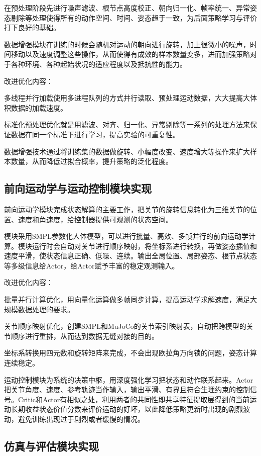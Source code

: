 在预处理阶段先进行噪声滤波、根节点高度校正、朝向归一化、帧率统一、异常姿态剔除等处理使得所有的动作空间、时间、姿态趋于一致，为后面策略学习与评价打下良好的基础。

数据增强模块在训练的时候会随机对运动的朝向进行旋转，加上很微小的噪声，时间移动以及速度调整这些操作，从而使得有成效的样本数量变多，进而加强策略对于各种环境、各种起始状况的适应程度以及抵抗性的能力。

改进优化内容：

多线程并行加载使用多进程队列的方式并行读取、预处理运动数据，大大提高大体积数据的加载速度。

标准化预处理优化就是用滤波、对齐、归一化、异常剔除等一系列的处理方法来保证数据在同一个标准下进行学习，提高实验的可重复性。

数据增强技术通过将训练集的数据做旋转、小幅度改变、速度增大等操作来扩大样本数量，从而降低过拟合概率，提升策略的泛化程度。

\subsection{前向运动学与运动控制模块实现}\label{ux524dux5411ux8fd0ux52a8ux5b66ux4e0eux8fd0ux52a8ux63a7ux5236ux6a21ux5757ux5b9eux73b0}

前向运动学模块完成状态解算的主要工作，把关节的旋转信息转化为三维关节的位置、速度和角速度，给控制器提供可观测的状态空间。

模块采用SMPL参数化人体模型，可以进行批量、高效、多帧并行的前向运动学计算。模块运行时会自动对关节进行顺序映射，将坐标系进行转换，再做姿态插值和速度平滑，使状态信息正确、低噪、连续。输出全局位置、局部姿态、根节点状态等多级信息给Actor，给Actor赋予丰富的稳定观测输入。

改进优化内容：

批量并行计算优化，用向量化运算做多帧同步计算，提高运动学求解速度，满足大规模数据处理的要求。

关节顺序映射优化，创建SMPL和MuJoCo的关节索引映射表，自动把跨模型的关节顺序进行重排，从而达到数据无缝对接的目的。

坐标系转换用四元数和旋转矩阵来完成，不会出现欧拉角万向锁的问题，姿态计算连续稳定。

运动控制模块为系统的决策中枢，用深度强化学习把状态和动作联系起来。Actor把关节角度、速度、参考轨迹当作输入，输出平滑、有界且符合生理约束的控制信号。Critic和Actor有相似之处，利用两者的共同性即共享特征提取层得到的当前运动长期收益状态价值分数来评价运动的好坏，以此降低策略更新时出现的剧烈波动，避免训练出现过于剧烈或者缓慢的情况。

\subsection{仿真与评估模块实现}\label{ux4effux771fux4e0eux8bc4ux4f30ux6a21ux5757ux5b9eux73b0}

